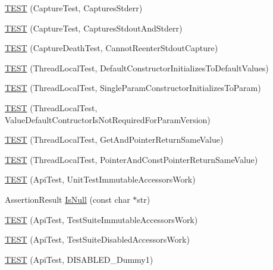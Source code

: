 \begin{DoxyCompactItemize}
\item 
\mbox{\hyperlink{namespacetesting_1_1internal_abbc9510a4f690912c32835213d95198f}{T\+E\+ST}} (Capture\+Test, Captures\+Stderr)
\item 
\mbox{\hyperlink{namespacetesting_1_1internal_a341ff65f3ca44b27fc51f03a9a05bee8}{T\+E\+ST}} (Capture\+Test, Captures\+Stdout\+And\+Stderr)
\item 
\mbox{\hyperlink{namespacetesting_1_1internal_a325a786fb22b87e5aa8d8f584b42ab09}{T\+E\+ST}} (Capture\+Death\+Test, Cannot\+Reenter\+Stdout\+Capture)
\item 
\mbox{\hyperlink{namespacetesting_1_1internal_af366e28e373f36480decc2ea586f48f0}{T\+E\+ST}} (Thread\+Local\+Test, Default\+Constructor\+Initializes\+To\+Default\+Values)
\item 
\mbox{\hyperlink{namespacetesting_1_1internal_a5a52dd578217050e621ebd2aace97a70}{T\+E\+ST}} (Thread\+Local\+Test, Single\+Param\+Constructor\+Initializes\+To\+Param)
\item 
\mbox{\hyperlink{namespacetesting_1_1internal_a6dffc8331590224259b60e855ad07d03}{T\+E\+ST}} (Thread\+Local\+Test, Value\+Default\+Contructor\+Is\+Not\+Required\+For\+Param\+Version)
\item 
\mbox{\hyperlink{namespacetesting_1_1internal_a0e7c2d58a313bec0821df19f44351d84}{T\+E\+ST}} (Thread\+Local\+Test, Get\+And\+Pointer\+Return\+Same\+Value)
\item 
\mbox{\hyperlink{namespacetesting_1_1internal_aaed45d6ba960f02e8d3d042c606bc98e}{T\+E\+ST}} (Thread\+Local\+Test, Pointer\+And\+Const\+Pointer\+Return\+Same\+Value)
\item 
\mbox{\hyperlink{namespacetesting_1_1internal_a9ac879683abb06d1c0bba3a339ea2f40}{T\+E\+ST}} (Api\+Test, Unit\+Test\+Immutable\+Accessors\+Work)
\item 
Assertion\+Result \mbox{\hyperlink{namespacetesting_1_1internal_adcfd37a66bc4cb0e8291cf46e1a6c72b}{Is\+Null}} (const char $\ast$str)
\item 
\mbox{\hyperlink{namespacetesting_1_1internal_a1aef4ac7102e97f0941178e0ecf5c776}{T\+E\+ST}} (Api\+Test, Test\+Suite\+Immutable\+Accessors\+Work)
\item 
\mbox{\hyperlink{namespacetesting_1_1internal_a765c62c0b121a84326d39383273f7c91}{T\+E\+ST}} (Api\+Test, Test\+Suite\+Disabled\+Accessors\+Work)
\item 
\mbox{\hyperlink{namespacetesting_1_1internal_a9ed5f89c92532506899e3908e79af4de}{T\+E\+ST}} (Api\+Test, D\+I\+S\+A\+B\+L\+E\+D\+\_\+\+Dummy1)
\item 

\end{DoxyCompactItemize}
